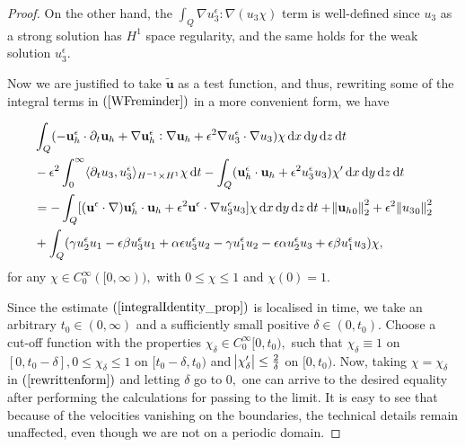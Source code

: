 \documentclass[11pt, a4paper]{article}
\newcommand*\diff{\mathop{}\!\mathrm{d}}
\begin{document}
\begin{proof}
On the other hand, the $ \int_Q \nabla u^\epsilon_3 : \nabla (u_3 \chi) $ term is well-defined since $u_3$ as a strong solution has $H^1$ space regularity, and the same holds for the weak solution $u^\epsilon_3.$

Now we are justified to take $\tilde{\mathbf{u}}$ as a test function, and thus, rewriting some of the integral terms in $(\ref{WFreminder})$ in a more convenient form, we have

\begin{equation} \label{rewrittenform}
\begin{split}
& \int_Q (- \mathbf{u}_h^\epsilon \cdot \partial_t \mathbf{u}_h + \nabla \mathbf{u}_h^\epsilon : \nabla \mathbf{u}_h + \epsilon^2 \nabla u_3^\epsilon \cdot \nabla u_3) \chi \diff x \diff y \diff z \diff t \\
& - \epsilon^2 \int_0^\infty \langle \partial_t u_3 , u_3^\epsilon \rangle _{H^{-1} \times H^1} \chi \diff t - \int_Q (\mathbf{u}_h^\epsilon \cdot \mathbf{u}_h + \epsilon^2 u_3^\epsilon u_3) \chi' \diff x \diff y \diff z \diff t \\
& = - \int_Q [(\mathbf{u}^\epsilon \cdot \nabla) \mathbf{u}_h^\epsilon \cdot \mathbf{u}_h + \epsilon^2 \mathbf{u}^\epsilon \cdot \nabla u_3^\epsilon u_3] \chi \diff x \diff y \diff z \diff t + \norm{{\mathbf{u}_h}_0}_2^2 + \epsilon^2 \norm{{u_3}_0}_2^2 \\
& + \int_Q ( \gamma u_2^\epsilon u_1 - \epsilon \beta u_3^\epsilon u_1 + \alpha \epsilon u_3^\epsilon u_2 - \gamma u_1^\epsilon u_2 - \epsilon \alpha u^\epsilon_2 u_3 + \epsilon \beta u_1^\epsilon u_3) \chi,\raisetag{80pt}
\end{split}
\end{equation}
%
for any $\chi \in C^\infty_0 ([0,\infty)),$ with $0 \leq \chi \leq 1$ and $\chi (0) = 1.$

Since the estimate $(\ref{integralIdentity_prop})$ is localised in time, we take an arbitrary $t_0 \in (0, \infty)$ and a sufficiently small positive $\delta \in (0, t_0).$ Choose a cut-off function with the properties $\chi_\delta \in C^\infty_0 [0,t_0),$ such that $\chi_\delta \equiv 1$ on $[0, t_0 -\delta], 0 \leq \chi_\delta \leq 1$ on $[t_0 - \delta, t_0 )$ and $\abs{\chi_\delta '} \leq \frac{2}{\delta}$ on $[0, t_0).$ Now, taking $\chi = \chi_\delta$ in $(\ref{rewrittenform})$ and letting $\delta$ go to $0,$ one can arrive to the desired equality after performing the calculations for passing to the limit. It is easy to see that because of the velocities vanishing on the boundaries, the technical details remain unaffected, even though we are not on a periodic domain.


\end{proof}
\end{document}
